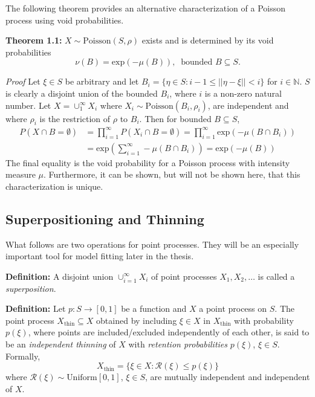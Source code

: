 \documentclass[12pt,twoside]{reedthesis}
\begin{document}
  The following theorem provides an alternative characterization of a
  Poisson process using void probabilities.
  
  \textbf{Theorem 1.1:} \(X\sim \text{Poisson}(S, \rho)\) exists and is
  determined by its void probabilities
  \[\nu(B) = \text{exp}(-\mu(B)), \; \; \text{bounded }B\subseteq S. \]
  
  \emph{Proof} Let \(\xi \in S\) be arbitrary and let
  \(B_i = \{ \eta \in S : i - 1 \leq ||\eta - \xi || < i \}\) for
  \(i \in \mathbb{N}.\) \(S\) is clearly a disjoint union of the bounded
  \(B_i\), where \(i\) is a non-zero natural number. Let
  \(X = \cup_1^\infty X_i\) where
  \(X_i \sim \text{Poisson}(B_i, \rho_i)\), are independent and where
  \(\rho_i\) is the restriction of \(\rho\) to \(B_i\). Then for bounded
  \(B\subseteq S\), \[
  \begin{aligned}
  P(X\cap B = \emptyset) &= \prod_{i = 1}^\infty P(X_i \cap B = \emptyset) = \prod_{i = 1}^\infty \text{exp}(-\mu(B\cap B_i))\\
  &= \text{exp}(\sum_{i=1}^\infty -\mu(B\cap B_i)) = \text{exp}(-\mu(B))
  \end{aligned}
  \] The final equality is the void probability for a Poisson process with
  intensity measure \(\mu\). Furthermore, it can be shown, but will not be
  shown here, that this characterization is unique.
  
  \subsection{Superpositioning and
  Thinning}\label{superpositioning-and-thinning}
  
  What follows are two operations for point processes. They will be an
  especially important tool for model fitting later in the thesis.
  
  \textbf{Definition:} A disjoint union \(\cup_{i = 1}^\infty X_i\) of
  point processes \(X_1, X_2, \dots\) is called a \emph{superposition}.
  
  \textbf{Definition:} Let \(p:S\rightarrow [0, 1]\) be a function and
  \(X\) a point process on \(S\). The point process
  \(X_{\text{thin}} \subseteq X\) obtained by including \(\xi \in X\) in
  \(X_{\text{thin}}\) with probability \(p(\xi)\), where points are
  included/excluded independently of each other, is said to be an
  \emph{independent thinning} of \(X\) with \emph{retention probabilities}
  \(p(\xi)\), \(\xi \in S\). Formally,
  \[ X_{\text{thin}} = \{ \xi \in X: \mathcal{R}(\xi) \leq p(\xi) \} \]
  where \(\mathcal{R}(\xi) \sim \text{Uniform}[0,1]\), \(\xi \in S\), are
  mutually independent and independent of \(X\).
  
\end{document}
